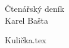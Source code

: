 \documentclass[a4paper,12pt]{article}
\begin{document}
    \begin{titlepage}\centering
        \vspace*{\fill}
        \Huge Čtenářský deník\\
        \Large Karel Bašta
        \vspace*{\fill}
    \end{titlepage}

    \renewcommand\contentsname{Obsah}
    \tableofcontents %
    \newpage

    {Kulička.tex}
\end{document}
